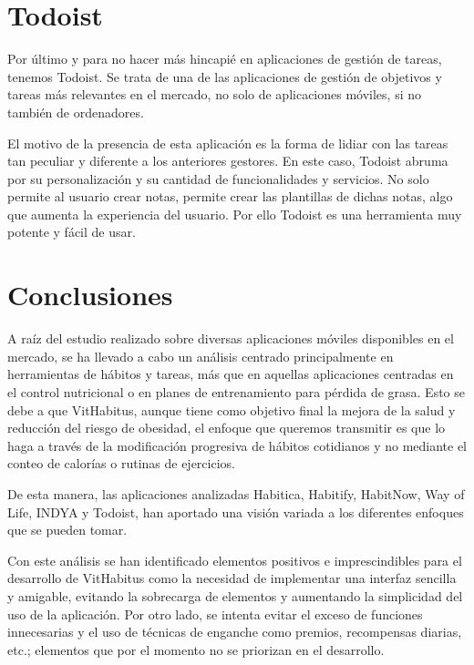 \section{Todoist}
Por último y para no hacer más hincapié en aplicaciones de gestión de tareas, tenemos Todoist. Se trata de una de las aplicaciones de gestión de objetivos y tareas más relevantes en el mercado, no solo de aplicaciones móviles, si no también de ordenadores. 

El motivo de la presencia de esta aplicación es la forma de lidiar con las tareas tan peculiar y diferente a los anteriores gestores. En este caso, Todoist abruma por su personalización y su cantidad de funcionalidades y servicios. No solo permite al usuario crear notas, permite crear las plantillas de dichas notas, algo que aumenta la experiencia del usuario.  Por ello Todoist es una herramienta muy potente  y fácil de usar. 

\section{Conclusiones}

A raíz del estudio realizado sobre diversas aplicaciones móviles disponibles en el mercado, se ha llevado a cabo un análisis centrado principalmente en herramientas de hábitos y tareas, más que en aquellas aplicaciones centradas en el control nutricional o en planes de entrenamiento para pérdida de grasa. Esto se debe a que VitHabitus, aunque tiene como objetivo final la mejora de la salud y reducción del riesgo de obesidad, el enfoque que queremos transmitir es que lo haga a través de la modificación progresiva de hábitos cotidianos y no mediante el conteo de calorías o rutinas de ejercicios. 

De esta manera, las aplicaciones analizadas Habitica, Habitify, HabitNow, Way of Life, INDYA y Todoist, han aportado una visión variada a los diferentes enfoques que se pueden tomar. 

Con este análisis se han identificado elementos positivos e imprescindibles para el desarrollo de VitHabitus como la necesidad de implementar una interfaz sencilla y amigable, evitando la sobrecarga de elementos y aumentando la simplicidad del uso de la aplicación. Por otro lado, se intenta evitar el exceso de funciones innecesarias y el uso de técnicas de enganche como premios, recompensas diarias, etc.; elementos que por el momento no se priorizan en el desarrollo.
